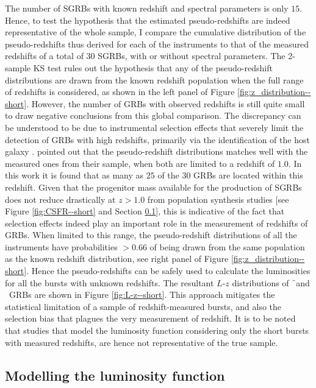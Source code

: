 The number of SGRBs with known redshift and spectral parameters is only $15$. Hence, to test the hypothesis that the estimated pseudo-redshifts are indeed representative of the whole sample, I compare the cumulative distribution of the pseudo-redshifts thus derived for each of the instruments to that of the measured redshifts of a total of $30$ SGRBs, with or without spectral parameters. The 2-sample KS test rules out the hypothesis that any of the pseudo-redshift distributions are drawn from the known redshift population when the full range of redshifts is considered, as shown in the left panel of Figure \ref{fig:z_distribution--short}. However, the number of GRBs with observed redshifts is still quite small to draw negative conclusions from this global comparison. The discrepancy can be understood to be due to instrumental selection effects that severely limit the detection of GRBs with high redshifts, primarily via the identification of the host galaxy \citep{Berger-2014-sGRB_review}.  pointed out that the pseudo-redshift distributions matches well with the measured ones from their sample, when both are limited to a redshift of $1.0$. In this work it is found that as many as $25$ of the $30$ GRBs are located within this redshift. Given that the progenitor mass available for the production of SGRBs does not reduce drastically at $z > 1.0$ from population synthesis studies [see Figure \ref{fig:CSFR--short} and Section \ref{subsec:modelling_LF--short}], this is indicative of the fact that selection effects indeed play an important role in the measurement of redshifts of GRBs. When limited to this range, the pseudo-redshift distributions of all the instruments have probabilities $> 0.66$ of being drawn from the same population as the known redshift distribution, see right panel of Figure \ref{fig:z_distribution--short}. Hence the pseudo-redshifts can be safely used to calculate the luminosities for all the bursts with unknown redshifts. The resultant $L$-$z$ distributions of \f\ and \B\ GRBs are shown in Figure \ref{fig:L-z--short}. This approach mitigates the statistical limitation of a sample of redshift-measured bursts, and also the selection bias that plagues the very measurement of redshift. It is to be noted that studies that model the luminosity function considering only the short bursts with measured redshifts, are hence not representative of the true sample.


\subsection{Modelling the luminosity function}
\label{subsec:modelling_LF--short}


